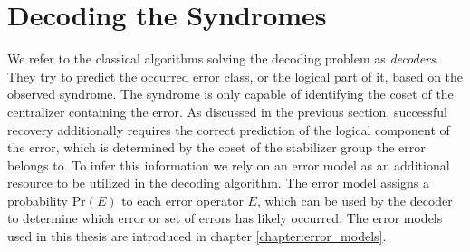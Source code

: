 \section{Decoding the Syndromes}\label{sec:decoding_problem_general}

We refer to the classical algorithms solving the decoding problem as \emph{decoders}.
They try to predict the occurred error class, or the logical part of it, based on the observed syndrome. 
The syndrome is only capable of identifying the coset of the centralizer containing the error. 
As discussed in the previous section, successful recovery additionally requires the correct prediction of the logical component of the error, which is determined by the coset of the stabilizer group the error belongs to.
To infer this information we rely on an error model as an additional resource to be utilized in the decoding algorithm.
The error model assigns a probability $\text{Pr}(E)$ to each error operator $E$, which can be used by the decoder to determine which error or set of errors has likely occurred. 
The error models used in this thesis are introduced in chapter \ref{chapter:error_models}.

